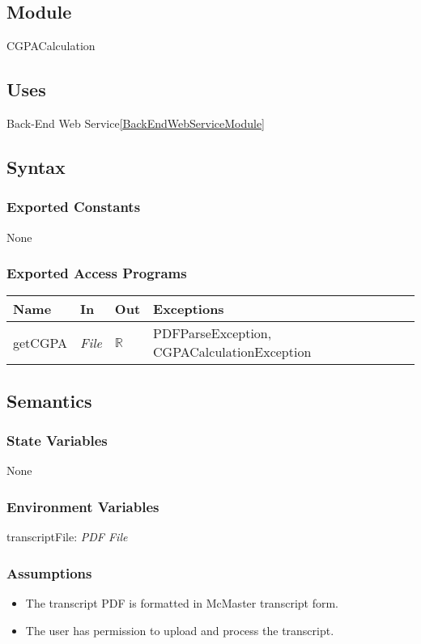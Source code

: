 \documentclass[12pt, titlepage]{article}
\begin{document}
\begin{itemize}
\subsection{Module}
CGPACalculation

\subsection{Uses}
Back-End Web Service\ref{BackEndWebServiceModule}

\subsection{Syntax}

\subsubsection{Exported Constants}
None

\subsubsection{Exported Access Programs}
\begin{center}
\begin{tabular}{p{4cm} p{3cm} p{3cm} p{3cm}}
\hline
\textbf{Name} & \textbf{In} & \textbf{Out} & \textbf{Exceptions} \\
\hline
getCGPA & \textit{File} & $\mathbb{R}$ & PDFParseException, CGPACalculationException \\
\hline
\end{tabular}
\end{center}

\subsection{Semantics}

\subsubsection{State Variables}
None

\subsubsection{Environment Variables}
transcriptFile: \textit{PDF File}

\subsubsection{Assumptions}
\begin{itemize}
  \item The transcript PDF is formatted in McMaster transcript form.
  \item The user has permission to upload and process the transcript.
\end{itemize}


\end{itemize}
\end{document}
